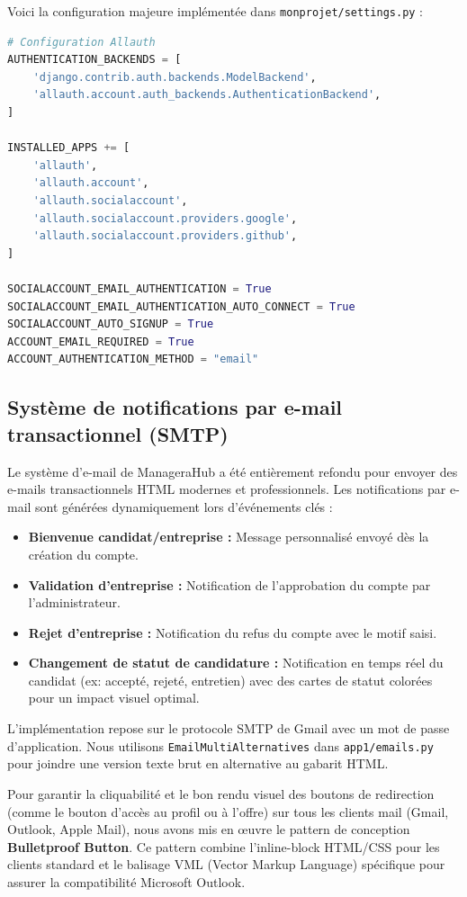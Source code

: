 Voici la configuration majeure implémentée dans \texttt{monprojet/settings.py} :

\begin{lstlisting}[language=Python, caption=Configuration de django-allauth pour OAuth dans settings.py]
# Configuration Allauth
AUTHENTICATION_BACKENDS = [
    'django.contrib.auth.backends.ModelBackend',
    'allauth.account.auth_backends.AuthenticationBackend',
]

INSTALLED_APPS += [
    'allauth',
    'allauth.account',
    'allauth.socialaccount',
    'allauth.socialaccount.providers.google',
    'allauth.socialaccount.providers.github',
]

SOCIALACCOUNT_EMAIL_AUTHENTICATION = True
SOCIALACCOUNT_EMAIL_AUTHENTICATION_AUTO_CONNECT = True
SOCIALACCOUNT_AUTO_SIGNUP = True
ACCOUNT_EMAIL_REQUIRED = True
ACCOUNT_AUTHENTICATION_METHOD = "email"
\end{lstlisting}

\subsection{Système de notifications par e-mail transactionnel (SMTP)}
Le système d'e-mail de ManageraHub a été entièrement refondu pour envoyer des e-mails transactionnels HTML modernes et professionnels. Les notifications par e-mail sont générées dynamiquement lors d'événements clés :
\begin{itemize}
    \item \textbf{Bienvenue candidat/\allowbreak entreprise :} Message personnalisé envoyé dès la création du compte.
    \item \textbf{Validation d'entreprise :} Notification de l'approbation du compte par l'administrateur.
    \item \textbf{Rejet d'entreprise :} Notification du refus du compte avec le motif saisi.
    \item \textbf{Changement de statut de candidature :} Notification en temps réel du candidat (ex: accepté, rejeté, entretien) avec des cartes de statut colorées pour un impact visuel optimal.
\end{itemize}

L'implémentation repose sur le protocole SMTP de Gmail avec un mot de passe d'application. Nous utilisons \texttt{EmailMultiAlternatives} dans \texttt{app1/emails.py} pour joindre une version texte brut en alternative au gabarit HTML.

Pour garantir la cliquabilité et le bon rendu visuel des boutons de redirection (comme le bouton d'accès au profil ou à l'offre) sur tous les clients mail (Gmail, Outlook, Apple Mail), nous avons mis en œuvre le pattern de conception \textbf{Bulletproof Button}. Ce pattern combine l'inline-block HTML/CSS pour les clients standard et le balisage VML (Vector Markup Language) spécifique pour assurer la compatibilité Microsoft Outlook.

